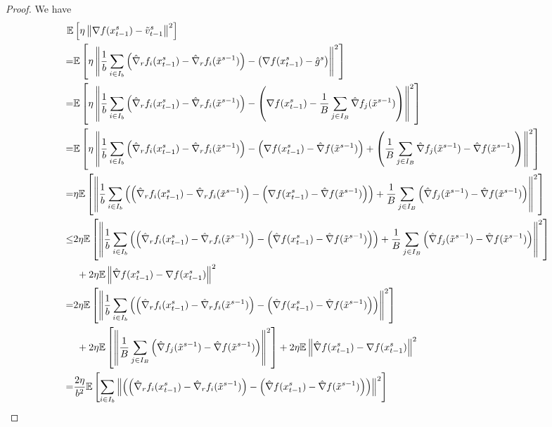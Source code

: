 \documentclass{article}
\newcommand*{\E}{\mathbb{E}}
\newcommand{\norm}[1]{\left\lVert#1\right\rVert}
\theoremstyle{definition}
\theoremstyle{remark}
\begin{document}
\begin{proof}
We have
\begin{align}
  \E&\left[\eta\norm{\nabla f(x_{t-1}^s)-{\tilde{v}_{t-1}^s}}^2\right]\notag\\
   =&\E\left[\eta\norm{\frac{1}{b}\sum_{i\in I_b}\left(\hat{\nabla}_r f_i(x_{t-1}^s)-\hat{\nabla}_r f_i(\tilde{x}^{s-1})\right) - \left(\nabla f(x_{t-1}^s)-\hat{g}^s\right)}^2\right]\notag\\
   =&\E\left[\eta\norm{\frac{1}{b}\sum_{i\in I_b}\left(\hat{\nabla}_r f_i(x_{t-1}^s)-\hat{\nabla}_r f_i(\tilde{x}^{s-1})\right) - \left(\nabla f(x_{t-1}^s)-\frac{1}{B}\sum_{j\in I_B}\hat{\nabla} f_j(\tilde{x}^{s-1})\right)}^2\right]\notag\\
   =&\notag\E\left[\eta\norm{\frac{1}{b}\sum_{i\in I_b}\left(\hat{\nabla}_r f_i(x_{t-1}^s)-\hat{\nabla}_r f_i(\tilde{x}^{s-1})\right) - \left(\nabla f(x_{t-1}^s) - \hat{\nabla} f(\tilde{x}^{s-1}) \right)+ \left(\frac{1}{B}\sum_{j\in I_B}\hat{\nabla} f_j(\tilde{x}^{s-1}) - \hat{\nabla} f(\tilde{x}^{s-1})\right)}^2\right]\\
   =&\notag\eta\E\left[\norm{\frac{1}{b}\sum_{i\in I_b}\left(\left(\hat{\nabla}_r f_i(x_{t-1}^s)-\hat{\nabla}_r f_i(\tilde{x}^{s-1})\right) - \left(\nabla f(x_{t-1}^s) - \hat{\nabla} f(\tilde{x}^{s-1}) \right)\right)+ \frac{1}{B}\sum_{j\in I_B}\left(\hat{\nabla} f_j(\tilde{x}^{s-1}) - \hat{\nabla} f(\tilde{x}^{s-1})\right)}^2\right]\\
   \leq &\notag2\eta\E\left[\norm{\frac{1}{b}\sum_{i\in I_b}\left(\left(\hat{\nabla}_r f_i(x_{t-1}^s)-\hat{\nabla}_r f_i(\tilde{x}^{s-1})\right) - \left(\hat{\nabla} f(x_{t-1}^s) - \hat{\nabla} f(\tilde{x}^{s-1}) \right)\right)+ \frac{1}{B}\sum_{j\in I_B}\left(\hat{\nabla} f_j(\tilde{x}^{s-1}) - \hat{\nabla} f(\tilde{x}^{s-1})\right)}^2\right]\\
   &\,\, + 2\eta \E \norm{\hat{\nabla} f(x_{t-1}^s)-\nabla f(x_{t-1}^s)}^2\label{RandSGE-var-estimate-lem-1}\\
    = &\notag 2 \eta\E\left[\norm{\frac{1}{b}\sum_{i\in I_b}\left(\left(\hat{\nabla}_r f_i(x_{t-1}^s)-\hat{\nabla}_r f_i(\tilde{x}^{s-1})\right) - \left(\hat{\nabla} f(x_{t-1}^s) - \hat{\nabla} f(\tilde{x}^{s-1}) \right)\right)}^2\right]\\
   &\,\, +2 \eta \E \left[ \norm{\frac{1}{B}\sum_{j\in I_B}\left(\hat{\nabla} f_j(\tilde{x}^{s-1}) - \hat{\nabla} f(\tilde{x}^{s-1})\right)}^2\right]+ 2\eta \E \norm{\hat{\nabla} f(x_{t-1}^s)-\nabla f(x_{t-1}^s)}^2\label{RandSGE-var-estimate-lem-2}\\
   = &\notag\frac{2\eta}{b^2}\E\left[\sum_{i\in I_b}\norm{\left(\left(\hat{\nabla}_r f_i(x_{t-1}^s)-\hat{\nabla}_r f_i(\tilde{x}^{s-1})\right) - \left({\hat{\nabla}} f(x_{t-1}^s) - \hat{\nabla} f(\tilde{x}^{s-1}) \right)\right)}^2\right]\\

\end{align}
\end{proof}
\end{document}
